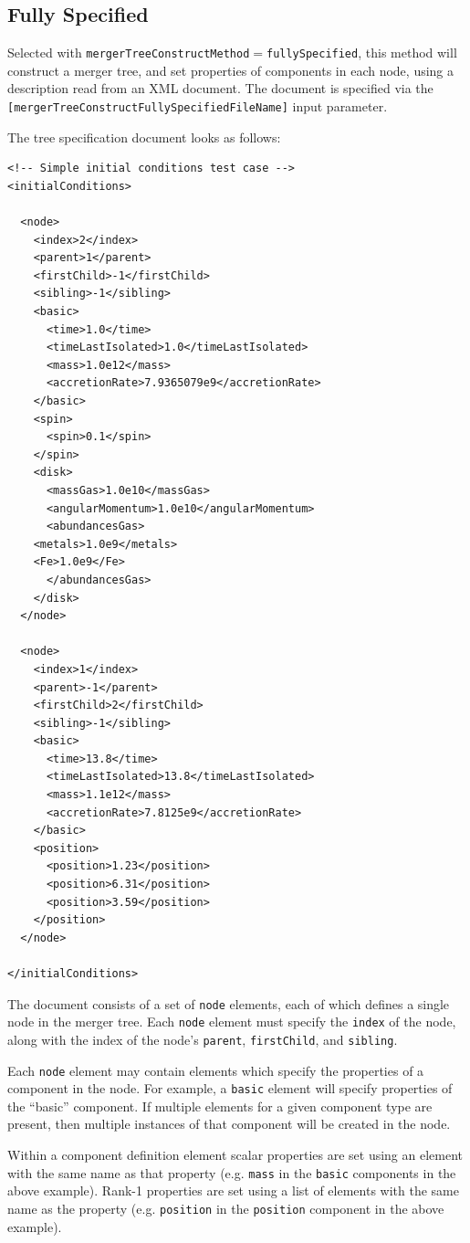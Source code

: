 \subsection{Fully Specified}\label{sec:TreeConstructFullySpecified}

Selected with {\tt mergerTreeConstructMethod}$=${\tt fullySpecified}, this method will construct a merger tree, and set properties of components in each node, using a description read from an XML document. The document is specified via the {\tt [mergerTreeConstructFullySpecifiedFileName]} input parameter.

The tree specification document looks as follows:
\begin{verbatim}
<!-- Simple initial conditions test case -->
<initialConditions>

  <node>
    <index>2</index>
    <parent>1</parent>
    <firstChild>-1</firstChild>
    <sibling>-1</sibling>
    <basic>
      <time>1.0</time>
      <timeLastIsolated>1.0</timeLastIsolated>
      <mass>1.0e12</mass>
      <accretionRate>7.9365079e9</accretionRate>
    </basic>
    <spin>
      <spin>0.1</spin>
    </spin>
    <disk>
      <massGas>1.0e10</massGas>
      <angularMomentum>1.0e10</angularMomentum>
      <abundancesGas>
	<metals>1.0e9</metals>
	<Fe>1.0e9</Fe>
      </abundancesGas>
    </disk>
  </node>

  <node>
    <index>1</index>
    <parent>-1</parent>
    <firstChild>2</firstChild>
    <sibling>-1</sibling>
    <basic>
      <time>13.8</time>
      <timeLastIsolated>13.8</timeLastIsolated>
      <mass>1.1e12</mass>
      <accretionRate>7.8125e9</accretionRate>
    </basic>
    <position>
      <position>1.23</position>
      <position>6.31</position>
      <position>3.59</position>
    </position>
  </node>

</initialConditions>
\end{verbatim}
The document consists of a set of {\tt node} elements, each of which defines a single node in the merger tree. Each {\tt node} element must specify the {\tt index} of the node, along with the index of the node's {\tt parent}, {\tt firstChild}, and {\tt sibling}. 

Each {\tt node} element may contain elements which specify the properties of a component in the node. For example, a {\tt basic} element will specify properties of the ``basic'' component. If multiple elements for a given component type are present, then multiple instances of that component will be created in the node.

Within a component definition element scalar properties are set using an element with the same name as that property (e.g. {\tt mass} in the {\tt basic} components in the above example). Rank-1 properties are set using a list of elements with the same name as the property (e.g. {\tt position} in the {\tt position} component in the above example).

